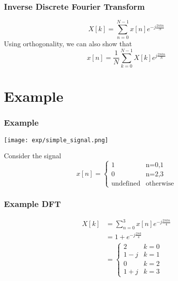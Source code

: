 \documentclass{beamer}
\begin{document}
\begin{frame}
  \frametitle{Inverse Discrete Fourier Transform}

  \begin{displaymath}
    X[k] = \sum_{n=0}^{N-1} x[n]e^{-j\frac{2\pi kn}{N}}
  \end{displaymath}
  Using  orthogonality, we can  also show that
  \begin{displaymath}
    x[n] = \frac{1}{N}\sum_{k=0}^{N-1} X[k]e^{j\frac{2\pi kn}{N}}
  \end{displaymath}
\end{frame}
    
\section[Example]{Example}
\setcounter{subsection}{1}

\begin{frame}
  \frametitle{Example}

  \centerline{\texttt{[image: exp/simple\_signal.png]}}
  
  Consider the signal
  \begin{displaymath}
    x[n] = \begin{cases} 1&\mbox{n=0,1}\\
      0 & \mbox{n=2,3}\\
      \mbox{undefined} & \mbox{otherwise}
    \end{cases}
  \end{displaymath}
\end{frame}

\begin{frame}
  \frametitle{Example DFT}

  \begin{align*}
    X[k] &= \sum_{n=0}^3 x[n] e^{-j\frac{2\pi kn}{4}}\\
    &= 1 + e^{-j\frac{2\pi k}{4}}\\
    &= \begin{cases}
      2 & k=0\\
      1-j & k=1\\
      0 & k=2\\
      1+j & k=3
    \end{cases}
  \end{align*}
\end{frame}
\end{document}
